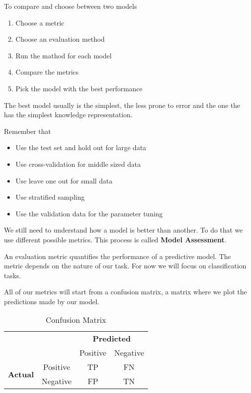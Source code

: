 \vspace{10pt}

To compare and choose between two models

\begin{enumerate}
    \item Choose a metric
    \item Choose an evaluation method
    \item Run the mathod for each model
    \item Compare the metrics
    \item Pick the model with the best performance
\end{enumerate}

The best model usually is the simplest, the less prone to error and the one the has the simplest knowledge representation.

\vspace{10pt}

Remember that

\begin{itemize}
    \item Use the test set and hold out for large data
    \item Use cross-validation for middle sized data
    \item Use leave one out for small data
    \item Use stratified sampling
    \item Use the validation data for the parameter tuning
\end{itemize}

\vspace{10pt}

We still need to understand how a model is better than another. To do that we use 
different possible metrics. This process is called \textbf{Model Assessment}.

\vspace{10pt}

An evaluation metric quantifies the performance of a predictive model. The metric
depends on the nature of our task. For now we will focus on classification tasks.

\vspace{10pt}

All of our metrics will start from a confusion matrix, a matrix where we plot the predictions made by our model.

\begin{table}[h]
\centering
\begin{tabular}{c|c|c|c}
\multicolumn{2}{c}{} & \multicolumn{2}{c}{\textbf{Predicted}} \\
\cline{3-4}
\multicolumn{2}{c|}{} & Positive & Negative \\ \hline
\multirow{2}{*}{\textbf{Actual}} 
& Positive & TP & FN \\ 
& Negative & FP & TN \\ 
\hline
\end{tabular}
\caption{Confusion Matrix}
\end{table}


